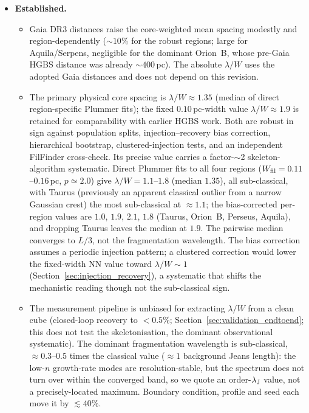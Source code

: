 \documentclass[usenatbib,twoside,twocolumn]{mnras}
\begin{document}
\begin{itemize}
    \item \textbf{Established.}
    \begin{itemize}
        \item Gaia DR3 distances raise the core-weighted mean spacing modestly and region-dependently ($\sim10\%$ for the robust regions; large for Aquila/Serpens, negligible for the dominant Orion~B, whose pre-Gaia HGBS distance was already $\sim400$\,pc). The absolute $\lambda/W$ uses the adopted Gaia distances and does not depend on this revision.
        \item The primary physical core spacing is $\lambda/W\approx1.35$ (median of direct region-specific Plummer fits); the fixed $0.10$\,pc-width value $\lambda/W\approx1.9$ is retained for comparability with earlier HGBS work. Both are robust in sign against population splits, injection--recovery bias correction, hierarchical bootstrap, clustered-injection tests, and an independent FilFinder cross-check. Its precise value carries a factor-$\sim$2 skeleton-algorithm systematic. Direct Plummer fits to all four regions ($W_{\rm fil}=0.11$--$0.16$\,pc, $p\simeq2.0$) give $\lambda/W=1.1$--$1.8$ (median $1.35$), all sub-classical, with Taurus (previously an apparent classical outlier from a narrow Gaussian crest) the most sub-classical at $\approx1.1$; the bias-corrected per-region values are $1.0$, $1.9$, $2.1$, $1.8$ (Taurus, Orion~B, Perseus, Aquila), and dropping Taurus leaves the median at $1.9$. The pairwise median converges to $L/3$, not the fragmentation wavelength. The bias correction assumes a periodic injection pattern; a clustered correction would lower the fixed-width NN value toward $\lambda/W\sim1$ (Section~\ref{sec:injection_recovery}), a systematic that shifts the mechanistic reading though not the sub-classical sign.
        \item The measurement pipeline is unbiased for extracting $\lambda/W$ from a clean cube (closed-loop recovery to $<0.5\%$; Section~\ref{sec:validation_endtoend}; this does not test the skeletonisation, the dominant observational systematic). The dominant fragmentation wavelength is sub-classical, $\approx0.3$--$0.5$ times the classical value ($\approx1$ background Jeans length): the low-$n$ growth-rate modes are resolution-stable, but the spectrum does not turn over within the converged band, so we quote an order-$\lambda_{\rm J}$ value, not a precisely-located maximum. Boundary condition, profile and seed each move it by $\lesssim40\%$.

\end{itemize}
\end{itemize}
\end{document}
